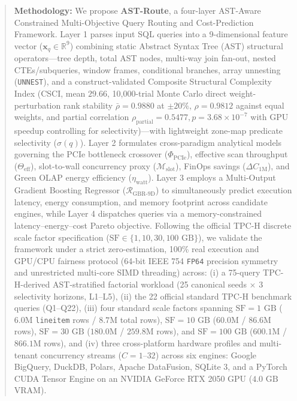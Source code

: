 \documentclass[10pt,a4paper]{article}
\begin{document}
\begin{quote}
\textbf{Methodology:} We propose \textbf{AST-Route}, a four-layer AST-Aware Constrained Multi-Objective Query Routing and Cost-Prediction Framework. Layer 1 parses input SQL queries into a 9-dimensional feature vector ($\mathbf{x}_q \in \mathbb{R}^9$) combining static Abstract Syntax Tree (AST) structural operators---tree depth, total AST nodes, multi-way join fan-out, nested CTEs/subqueries, window frames, conditional branches, array unnesting (\texttt{UNNEST}), and a construct-validated Composite Structural Complexity Index (CSCI, mean $29.66$, 10,000-trial Monte Carlo direct weight-perturbation rank stability $\bar{\rho}=0.9880$ at $\pm 20\%$, $\rho=0.9812$ against equal weights, and partial correlation $\rho_{\text{partial}}=0.5477, p=3.68\times 10^{-7}$ with GPU speedup controlling for selectivity)---with lightweight zone-map predicate selectivity ($\sigma(q)$). Layer 2 formulates cross-paradigm analytical models governing the PCIe bottleneck crossover ($\Phi_{\text{PCIe}}$), effective scan throughput ($\Theta_{\text{eff}}$), slot-to-wall concurrency proxy ($\mathcal{M}_{\text{slot}}$), FinOps savings ($\Delta C_{\text{1M}}$), and Green OLAP energy efficiency ($\eta_{\text{watt}}$). Layer 3 employs a Multi-Output Gradient Boosting Regressor ($\mathcal{R}_{\text{GBR-9D}}$) to simultaneously predict execution latency, energy consumption, and memory footprint across candidate engines, while Layer 4 dispatches queries via a memory-constrained latency--energy--cost Pareto objective. Following the official TPC-H discrete scale factor specification ($\text{SF} \in \{1, 10, 30, 100\text{ GB}\}$), we validate the framework under a strict zero-estimation, 100\% real execution and GPU/CPU fairness protocol (64-bit IEEE 754 \texttt{FP64} precision symmetry and unrestricted multi-core SIMD threading) across: (i) a 75-query TPC-H-derived AST-stratified factorial workload (25 canonical seeds $\times$ 3 selectivity horizons, L1--L5), (ii) the 22 official standard TPC-H benchmark queries (Q1--Q22), (iii) four standard scale factors spanning $\text{SF}=1\text{ GB}$ ($6.0\text{M}$ \texttt{lineitem} rows / $8.7\text{M}$ total rows), $\text{SF}=10\text{ GB}$ ($60.0\text{M}$ / $86.6\text{M}$ rows), $\text{SF}=30\text{ GB}$ ($180.0\text{M}$ / $259.8\text{M}$ rows), and $\text{SF}=100\text{ GB}$ ($600.1\text{M}$ / $866.1\text{M}$ rows), and (iv) three cross-platform hardware profiles and multi-tenant concurrency streams ($C=1\text{--}32$) across six engines: Google BigQuery, DuckDB, Polars, Apache DataFusion, SQLite 3, and a PyTorch CUDA Tensor Engine on an NVIDIA GeForce RTX 2050 GPU ($4.0\text{ GB}$ VRAM).\\[0.25em]

\end{quote}
\end{document}

